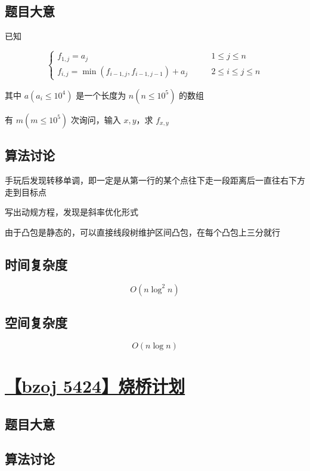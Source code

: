 \documentclass[UTF8]{article}
\begin{document}
\subsection{题目大意}

已知

$$
\begin{cases}
f_{1,j}=a_j &\qquad 1 \le j \le n \\
f_{i,j}=\min(f_{i-1,j},f_{i-1,j-1})+a_j &\qquad 2 \le i \le j \le n
\end{cases}
$$

其中 $a(a_i \le 10^4)$ 是一个长度为 $n(n \le 10^5)$ 的数组

有 $m(m \le 10^5)$ 次询问，输入 $x,y$，求 $f_{x,y}$

\subsection{算法讨论}

手玩后发现转移单调，即一定是从第一行的某个点往下走一段距离后一直往右下方走到目标点

写出动规方程，发现是斜率优化形式

由于凸包是静态的，可以直接线段树维护区间凸包，在每个凸包上三分就行

\subsection{时间复杂度}

$$
O(n \log^2 n)
$$

\subsection{空间复杂度}

$$
O(n \log n)
$$

\section{\href{https://www.lydsy.com/JudgeOnline/problem.php?id=5424}{【bzoj 5424】烧桥计划}}

\subsection{题目大意}

\subsection{算法讨论}
\end{document}
